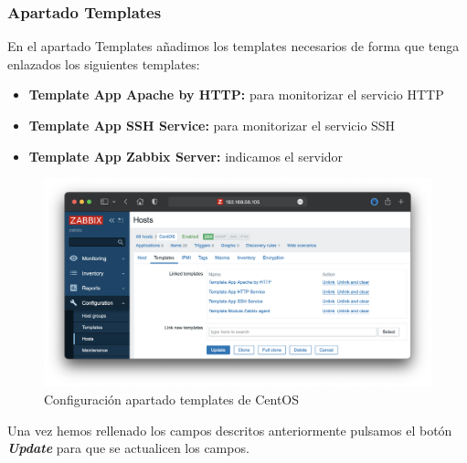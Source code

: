 \subsubsection{Apartado Templates}
En el apartado Templates añadimos los templates necesarios de forma que tenga enlazados los siguientes templates:
    \begin{itemize}
        \item \textbf{Template App Apache by HTTP:} para monitorizar el servicio HTTP
        \item \textbf{Template App SSH Service:} para monitorizar el servicio SSH
        \item \textbf{Template App Zabbix Server:} indicamos el servidor
    \end{itemize}
    \begin{figure}[H]
        \centering
        \includegraphics[scale=0.45]{images/centos_templates.png}
        \caption{Configuración apartado templates de CentOS}
        \label{fig:centos_templates}
    \end{figure}
Una vez hemos rellenado los campos descritos anteriormente pulsamos el botón \textbf{\emph{Update}} para que se actualicen los campos.

\newpage
